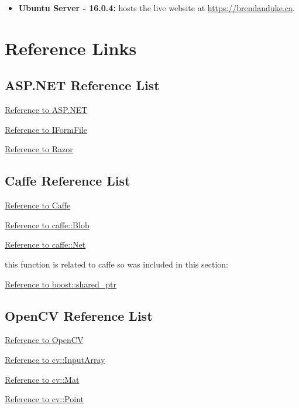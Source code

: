 \documentclass{scrreprt}
\begin{document}
\begin{itemize}
    \item \textbf{Ubuntu Server - 16.0.4:} hosts the live website at
            \url{https://brendanduke.ca}.
\end{itemize}

\chapter{Reference Links}

\section{ASP.NET Reference List}

\href{https://docs.microsoft.com/en-us/aspnet/core/mvc/overview}{Reference to ASP.NET}

\href{https://docs.microsoft.com/en-us/aspnet/core/api/microsoft.aspnetcore.http.iformfile}{Reference to IFormFile}

\href{https://docs.microsoft.com/en-us/aspnet/core/mvc/views/razor}{Reference to Razor}

\section{Caffe Reference List}

\href{http://caffe.berkeleyvision.org/doxygen/index.html}{Reference to Caffe}

\href{http://caffe.berkeleyvision.org/doxygen/classcaffe_1_1Blob.html}{Reference to caffe::Blob}

\href{http://caffe.berkeleyvision.org/doxygen/classcaffe_1_1Net.html}{Reference to caffe::Net}

this function is related to caffe so was included in this section:

\href{http://www.boost.org/doc/libs/1_63_0/libs/smart_ptr/shared_ptr.htm}{Reference to boost::shared\_ptr}


\section{OpenCV Reference List}

\href{http://docs.opencv.org/3.1.0/}{Reference to OpenCV}

\href{http://docs.opencv.org/3.1.0/d4/d32/classcv_1_1__InputArray.html}{Reference to cv::InputArray}

\href{http://docs.opencv.org/3.1.0/d3/d63/classcv_1_1Mat.html#details}{Reference to cv::Mat}

\href{http://docs.opencv.org/3.1.0/db/d4e/classcv_1_1Point__.html}{Reference to cv::Point}
\end{document}
